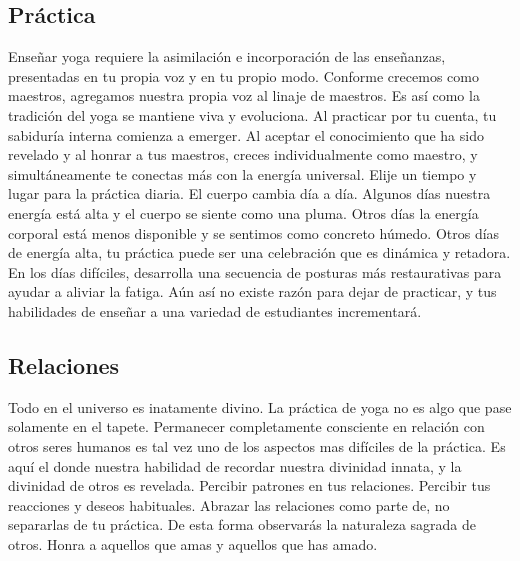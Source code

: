 \subsection{Práctica}
Enseñar yoga requiere la asimilación e incorporación de las enseñanzas, presentadas en tu propia voz y en tu propio modo. Conforme crecemos como maestros, agregamos nuestra propia voz al linaje de maestros. Es así como la tradición del yoga se mantiene viva y evoluciona. Al practicar por tu cuenta, tu sabiduría interna comienza a emerger. Al aceptar el conocimiento que ha sido revelado y al honrar a tus maestros, creces individualmente como maestro, y simultáneamente te conectas más con la energía universal. Elije un tiempo y lugar para la práctica diaria. El cuerpo cambia día a día. Algunos días nuestra energía está alta y el cuerpo se siente como una pluma. Otros días la energía corporal está menos disponible y se sentimos como concreto húmedo. Otros días de energía alta, tu práctica puede ser una celebración que es dinámica y retadora. En los días difíciles, desarrolla una secuencia de posturas más restaurativas para ayudar a aliviar la fatiga. Aún así no existe razón para dejar de practicar, y tus habilidades de enseñar a una variedad de estudiantes incrementará.

\subsection{Relaciones}
Todo en el universo es inatamente divino. La práctica de yoga no es algo que pase solamente en el tapete. Permanecer completamente consciente en relación con otros seres humanos es tal vez uno de los aspectos mas difíciles de la práctica. Es aquí el donde nuestra habilidad de recordar nuestra divinidad innata, y la divinidad de otros es revelada. Percibir patrones en tus relaciones. Percibir tus reacciones y deseos habituales. Abrazar las relaciones como parte de, no separarlas de tu práctica. De esta forma observarás la naturaleza sagrada de otros. Honra a aquellos que amas y aquellos que has amado.

